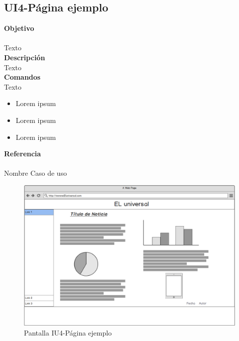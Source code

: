 \subsection{UI4-Página ejemplo}

\Large{\textbf{Objetivo}}\\\\
\normalsize{Texto}\\



\Large{\textbf{Descripción}}\\
\normalsize{Texto}\\


\Large{\textbf{Comandos}}\\
\normalsize{Texto}

\begin{itemize}
	\item Lorem ipsum
	\item Lorem ipsum
	\item Lorem ipsum
\end{itemize}

\Large{\textbf{Referencia}}\\\\
\normalsize{Nombre Caso de uso}

\begin{figure}
  \centering
	\includegraphics[scale=.3]{imagenes/Pantallas/UI4}
  \caption{Pantalla IU4-Página ejemplo}
  \label{fig:IU4}
\end{figure}
